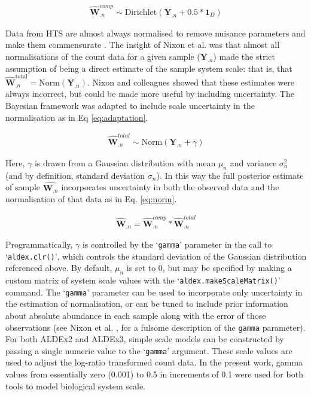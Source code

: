 \documentclass[10pt,letterpaper]{article}
\begin{document}
\begin{eqnarray}
	\label{eq:Dir}
	\hat{\mathbf{W}}^{comp}_{.n} \sim \mathrm{Dirichlet}(\mathbf{Y}_{.n} + 0.5 * \mathbf{1}_{D})
\end{eqnarray}

Data from HTS are almost always normalised to remove nuisance parameters and make them commensurate \cite{robinson_scaling_2010}. The insight of Nixon et al. \cite{nixon_scale_2024} was that almost all normalisations of the count data for a given sample ($\mathbf{Y}_{.n}$) made the strict assumption of being a direct estimate of the sample system scale: that is, that $\hat{\mathbf{W}}^{\mathrm{total}}_{.n} = \mathrm{Norm}(\mathbf{Y}_{.n})$. Nixon and colleagues showed that these estimates were always incorrect, but could be made more useful by including uncertainty. The Bayesian framework was adapted to include scale uncertainty in the normalisation as in Eq \ref{eq:adaptation}.

\begin{eqnarray}
	\label{eq:adaptation}
	\hat{\mathbf{W}}^{total}_{.n} \sim \mathrm{Norm}(\mathbf{Y}_{.n} + \gamma)
\end{eqnarray}

Here, $\gamma$ is drawn from a Gaussian distribution with mean $\mu_n$ and variance $\sigma^2_n$ (and by definition, standard deviation $\sigma_n$). In this way the full posterior estimate of sample $\hat{\mathbf{W}_{.n}}$ incorporates uncertainty in both the observed data and the normalisation of that data as in Eq. \ref{eq:norm}.

\begin{eqnarray}
	\label{eq:norm}
	\hat{\mathbf{W}}_{.n} = \hat{\mathbf{W}}^{comp}_{.n} * \hat{\mathbf{W}}^{total}_{.n}
\end{eqnarray}


Programmatically, $\gamma$ is controlled by the `\texttt{gamma}' parameter in the call to `\texttt{aldex.clr()}', which controls the standard deviation of the Gaussian distribution referenced above. By default, $\mu_n$ is set to 0, but may be specified by making a custom matrix of system scale values with the `\texttt{aldex.makeScaleMatrix()}' command. The `\texttt{gamma}' parameter can be used to incorporate only uncertainty in the estimation of normalisation, or can be tuned to include prior information about absolute abundance in each sample along with the error of those observations (see Nixon et al. \cite{nixon_incorporating_2025}, for a fulsome description of the \texttt{gamma} parameter). For both ALDEx2 and ALDEx3, simple scale models can be constructed by passing a single numeric value to the `\texttt{gamma}' argument. These scale values are used to adjust the log-ratio transformed count data. In the present work, gamma values from essentially zero (0.001) to 0.5 in increments of 0.1 were used for both tools to model biological system scale.
\end{document}
